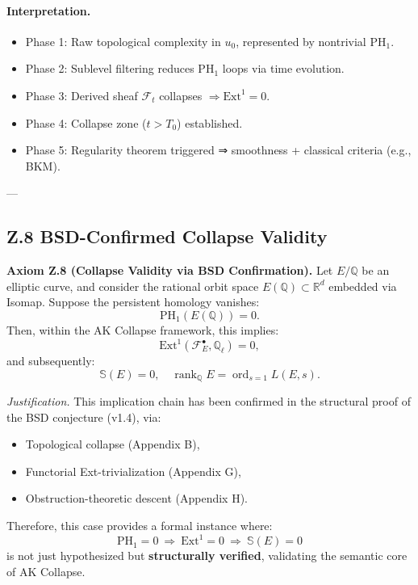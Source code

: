 \documentclass[11pt]{article}
\newcommand{\Sha}{\mathbb{S}}
\begin{document}
\begin{axiom}
\begin{axiom}
{{\paragraph{Interpretation.}
\begin{itemize}
  \item Phase 1: Raw topological complexity in $u_0$, represented by nontrivial $\mathrm{PH}_1$.
  \item Phase 2: Sublevel filtering reduces $\mathrm{PH}_1$ loops via time evolution.
  \item Phase 3: Derived sheaf $\mathcal{F}_t$ collapses $\Rightarrow \mathrm{Ext}^1 = 0$.
  \item Phase 4: Collapse zone ($t > T_0$) established.
  \item Phase 5: Regularity theorem triggered ⇒ smoothness + classical criteria (e.g., BKM).
\end{itemize}

---

\subsection*{Z.8 BSD-Confirmed Collapse Validity}

\textbf{Axiom Z.8 (Collapse Validity via BSD Confirmation).}  
Let \( E/\mathbb{Q} \) be an elliptic curve, and consider the rational orbit space \( E(\mathbb{Q}) \subset \mathbb{R}^d \) embedded via Isomap.  
Suppose the persistent homology vanishes:
\[
\mathrm{PH}_1(E(\mathbb{Q})) = 0.
\]
Then, within the AK Collapse framework, this implies:
\[
\mathrm{Ext}^1(\mathcal{F}_E^\bullet, \mathbb{Q}_\ell) = 0,
\]
and subsequently:
\[
\Sha(E) = 0, \quad \operatorname{rank}_\mathbb{Q} E = \operatorname{ord}_{s=1}L(E, s).
\]

\textit{Justification.}  
This implication chain has been confirmed in the structural proof of the BSD conjecture (v1.4),  
via:
\begin{itemize}
  \item Topological collapse (Appendix B),
  \item Functorial Ext-trivialization (Appendix G),
  \item Obstruction-theoretic descent (Appendix H).
\end{itemize}

Therefore, this case provides a formal instance where:
\[
\boxed{\mathrm{PH}_1 = 0 \ \Rightarrow \ \mathrm{Ext}^1 = 0 \ \Rightarrow \ \Sha(E) = 0}
\]
is not just hypothesized but \textbf{structurally verified}, validating the semantic core of AK Collapse.

}}
\end{axiom}
\end{axiom}
\end{document}
